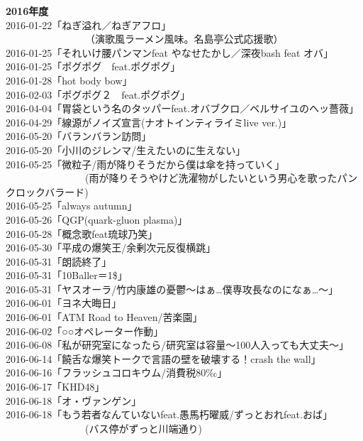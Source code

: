 {\large{\bf 2016年度}}\\
2016-01-22「ねぎ溢れ／ねぎアフロ」\\
 \ \ \ \ \ \ \ \ \ \ \ \ \ \ \ \ （演歌風ラーメン風味。名島亭公式応援歌） \\
2016-01-25「それいけ腰パンマンfeat やなせたかし／深夜bash feat オバ」 \\
2016-01-25「ポグポグ　feat.ポグポグ」 \\
2016-01-28「hot body bow」 \\
2016-02-03「ポグポグ２　feat.ポグポグ」\\ 
2016-04-04「胃袋という名のタッパーfeat.オバブクロ／ベルサイユのヘッ薔薇」 \\
2016-04-29「線源がノイズ宣言(ナオトインティライミlive ver.)」 \\
2016-05-20「バランバラン訪問」 \\
2016-05-20「小川のジレンマ/生えたいのに生えない」\\ 
2016-05-25「微粒子/雨が降りそうだから僕は傘を持っていく」\\
 \ \ \ \ \ \ \ \ \ \ \ \ \ \ \ \ (雨が降りそうやけど洗濯物がしたいという男心を歌ったパンクロックバラード)\\ 
2016-05-25「always autumn」\\
2016-05-26「QGP(quark-gluon plasma)」\\ 
2016-05-28「概念歌feat琉球乃笑」 \\
2016-05-30「平成の爆笑王/余剰次元反復横跳」\\ 
2016-05-31「朗読終了」 \\
2016-05-31「10Baller＝1\$」\\ 
2016-05-31「ヤスオーラ/竹内康雄の憂鬱〜はぁ…僕専攻長なのになぁ…〜」 \\
2016-06-01「ヨネ大晦日」 \\
2016-06-01「ATM Road to Heaven/苦楽園」\\ 
2016-06-02「○○オペレーター作動」 \\
2016-06-08「私が研究室になったら/研究室は容量〜100人入っても大丈夫〜」 \\
2016-06-14「饒舌な爆笑トークで言語の壁を破壊する！crash the wall」 \\
2016-06-16「フラッシュコロキウム/消費税80‰」 \\
2016-06-17「KHD48」 \\
2016-06-18「オ・ヴァンゲン」\\ 
2016-06-18「もう若者なんていないfeat.愚馬朽曜威/ずっとおれfeat.おば」\\
 \ \ \ \ \ \ \ \ \ \ \ \ \ \ \ \ (バス停がずっと川端通り) \\
